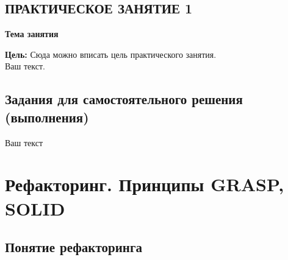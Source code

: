 \newpage%
\section*{ПРАКТИЧЕСКОЕ ЗАНЯТИЕ 1}%
 \vspace{-10pt}%
\begin{center}%
 {\bf%
 Тема занятия}
\end{center}%

{\bf Цель:} Сюда можно вписать цель практического занятия.
\\%

Ваш текст.

\newpage%
\section*{Задания для самостоятельного решения (выполнения)}%

Ваш текст

\newpage%


\newpage %
\chapter{Рефакторинг. Принципы GRASP, SOLID}

\section{Понятие рефакторинга}

